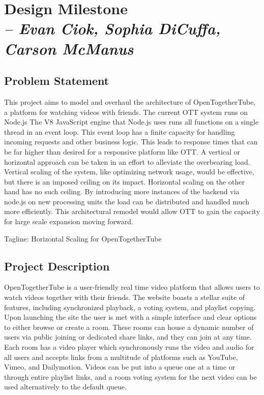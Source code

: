\chapter{Design Milestone \\
  \small{\textit{-- Evan Ciok, Sophia DiCuffa, Carson McManus}}
  \label{Chapter::designMilestone}}

\section{Problem Statement}

This project aims to model and overhaul the architecture of OpenTogetherTube, a platform for watching videos with
friends. The current OTT system runs on Node.js The V8 JavaScript engine that Node.js uses runs all functions on
a single thread in an event loop. This event loop has a finite capacity for handling incoming requests and other
business logic. This leads to response times that can be far higher than desired for a responsive platform like OTT.
A vertical or horizontal approach can be taken in an effort to alleviate the overbearing load. Vertical scaling
of the system, like optimizing network usage, would be effective, but there is an imposed ceiling on its impact.
Horizontal scaling on the other hand has no such ceiling. By introducing more instances of the backend via
node.js on new processing units the load can be distributed and handled much more efficiently. This architectural
remodel would allow OTT to gain the capacity for large scale expansion moving forward.

Tagline: Horizontal Scaling for OpenTogetherTube

\section{Project Description}

OpenTogetherTube is a user-friendly real time video platform that allows users to watch videos together with their
friends. The website boasts a stellar suite of features, including synchronized playback, a voting system, and
playlist copying. Upon launching the site the user is met with a simple interface and clear options to either
browse or create a room. These rooms can house a dynamic number of users via public joining or dedicated share links,
and they can join at any time. Each room has a video player which synchronously runs the video and audio for all
users and accepts links from a multitude of platforms such as YouTube, Vimeo, and Dailymotion. Videos can be put
into a queue one at a time or through entire playlist links, and a room voting system for the next video can be used
alternatively to the default queue.

